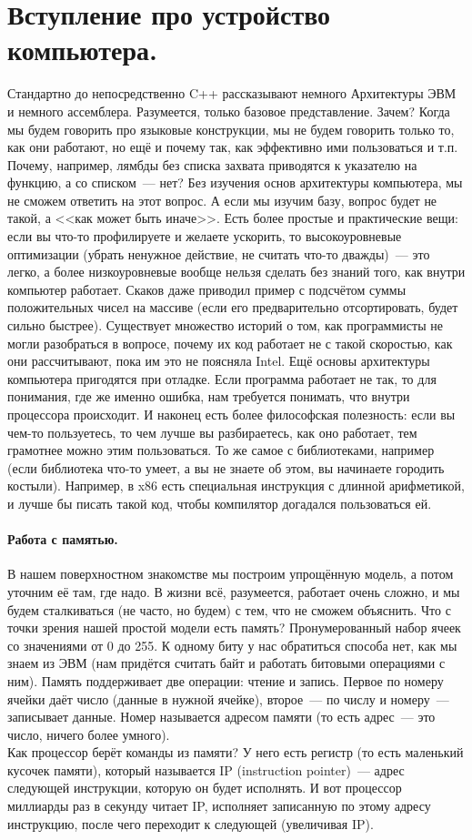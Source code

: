 \documentclass{article}
\begin{document}
    \tableofcontents
    \section{Вступление про устройство компьютера.}
    Стандартно до непосредственно C++ рассказывают немного Архитектуры ЭВМ и немного ассемблера. Разумеется, только базовое представление. Зачем? Когда мы будем говорить про языковые конструкции, мы не будем говорить только то, как они работают, но ещё и почему так, как эффективно ими пользоваться и т.п. Почему, например, лямбды без списка захвата приводятся к указателю на функцию, а со списком~--- нет? Без изучения основ архитектуры компьютера, мы не сможем ответить на этот вопрос. А если мы изучим базу, вопрос будет не такой, а <<как может быть иначе>>. Есть более простые и практические вещи: если вы что-то профилируете и желаете ускорить, то высокоуровневые оптимизации (убрать ненужное действие, не считать что-то дважды)~--- это легко, а более низкоуровневые вообще нельзя сделать без знаний того, как внутри компьютер работает. Скаков даже приводил пример с подсчётом суммы положительных чисел на массиве (если его предварительно отсортировать, будет сильно быстрее). Существует множество историй о том, как программисты не могли разобраться в вопросе, почему их код работает не с такой скоростью, как они рассчитывают, пока им это не поясняла Intel. Ещё основы архитектуры компьютера пригодятся при отладке. Если программа работает не так, то для понимания, где же именно ошибка, нам требуется понимать, что внутри процессора происходит. И наконец есть более философская полезность: если вы чем-то пользуетесь, то чем лучше вы разбираетесь, как оно работает, тем грамотнее можно этим пользоваться. То же самое с библиотеками, например (если библиотека что-то умеет, а вы не знаете об этом, вы начинаете городить костыли). Например, в x86 есть специальная инструкция с длинной арифметикой, и лучше бы писать такой код, чтобы компилятор догадался пользоваться ей.
    \paragraph{Работа с памятью.}
    В нашем поверхностном знакомстве мы построим упрощённую модель, а потом уточним её там, где надо. В жизни всё, разумеется, работает очень сложно, и мы будем сталкиваться (не часто, но будем) с тем, что не сможем объяснить. Что с точки зрения нашей простой модели есть память? Пронумерованный набор ячеек со значениями от 0 до 255. К одному биту у нас обратиться способа нет, как мы знаем из ЭВМ (нам придётся считать байт и работать битовыми операциями с ним). Память поддерживает две операции: чтение и запись. Первое по номеру ячейки даёт число (данные в нужной ячейке), второе~--- по числу и номеру~--- записывает данные. Номер называется адресом памяти (то есть адрес~--- это число, ничего более умного).\\
    Как процессор берёт команды из памяти? У него есть регистр (то есть маленький кусочек памяти), который называется IP (instruction pointer)~--- адрес следующей инструкции, которую он будет исполнять. И вот процессор миллиарды раз в секунду читает IP, исполняет записанную по этому адресу инструкцию, после чего переходит к следующей (увеличивая IP).
\end{document}

